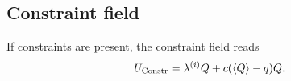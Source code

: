 \documentclass[%
 reprint, linenumbers,
 amsmath,amssymb,
 aps, physrev
]{revtex4-2}
\begin{document}
\subsection{Constraint field}
If constraints are present, the constraint field reads
\begin{equation}
  U_\text{Constr} = \lambda^{(i)} Q + c(\expval Q-q)Q.
\end{equation}
\newpage



\nocite{*}


\end{document}
